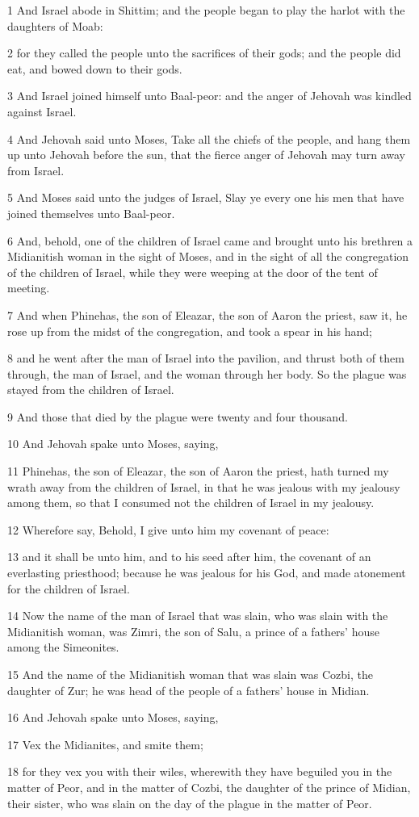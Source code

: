 \par 1 And Israel abode in Shittim; and the people began to play the harlot with the daughters of Moab:
\par 2 for they called the people unto the sacrifices of their gods; and the people did eat, and bowed down to their gods.
\par 3 And Israel joined himself unto Baal-peor: and the anger of Jehovah was kindled against Israel.
\par 4 And Jehovah said unto Moses, Take all the chiefs of the people, and hang them up unto Jehovah before the sun, that the fierce anger of Jehovah may turn away from Israel.
\par 5 And Moses said unto the judges of Israel, Slay ye every one his men that have joined themselves unto Baal-peor.
\par 6 And, behold, one of the children of Israel came and brought unto his brethren a Midianitish woman in the sight of Moses, and in the sight of all the congregation of the children of Israel, while they were weeping at the door of the tent of meeting.
\par 7 And when Phinehas, the son of Eleazar, the son of Aaron the priest, saw it, he rose up from the midst of the congregation, and took a spear in his hand;
\par 8 and he went after the man of Israel into the pavilion, and thrust both of them through, the man of Israel, and the woman through her body. So the plague was stayed from the children of Israel.
\par 9 And those that died by the plague were twenty and four thousand.
\par 10 And Jehovah spake unto Moses, saying,
\par 11 Phinehas, the son of Eleazar, the son of Aaron the priest, hath turned my wrath away from the children of Israel, in that he was jealous with my jealousy among them, so that I consumed not the children of Israel in my jealousy.
\par 12 Wherefore say, Behold, I give unto him my covenant of peace:
\par 13 and it shall be unto him, and to his seed after him, the covenant of an everlasting priesthood; because he was jealous for his God, and made atonement for the children of Israel.
\par 14 Now the name of the man of Israel that was slain, who was slain with the Midianitish woman, was Zimri, the son of Salu, a prince of a fathers' house among the Simeonites.
\par 15 And the name of the Midianitish woman that was slain was Cozbi, the daughter of Zur; he was head of the people of a fathers' house in Midian.
\par 16 And Jehovah spake unto Moses, saying,
\par 17 Vex the Midianites, and smite them;
\par 18 for they vex you with their wiles, wherewith they have beguiled you in the matter of Peor, and in the matter of Cozbi, the daughter of the prince of Midian, their sister, who was slain on the day of the plague in the matter of Peor.

